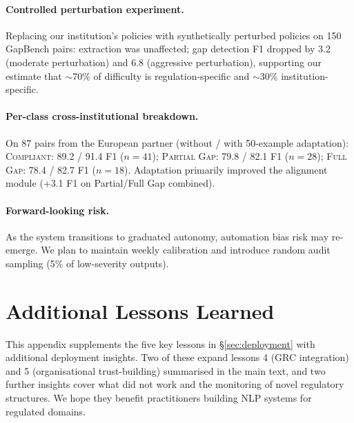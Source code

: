 \documentclass[11pt]{article}
\begin{document}
\paragraph{Controlled perturbation experiment.} Replacing our institution's policies with synthetically perturbed policies on 150 GapBench pairs: extraction was unaffected; gap detection F1 dropped by 3.2 (moderate perturbation) and 6.8 (aggressive perturbation), supporting our estimate that $\sim$70\% of difficulty is regulation-specific and $\sim$30\% institution-specific.

\paragraph{Per-class cross-institutional breakdown.} On 87 pairs from the European partner (without / with 50-example adaptation): \textsc{Compliant}: 89.2 / 91.4 F1 ($n{=}41$); \textsc{Partial Gap}: 79.8 / 82.1 F1 ($n{=}28$); \textsc{Full Gap}: 78.4 / 82.7 F1 ($n{=}18$). Adaptation primarily improved the alignment module (+3.1 F1 on Partial/Full Gap combined).

\paragraph{Forward-looking risk.} As the system transitions to graduated autonomy, automation bias risk may re-emerge. We plan to maintain weekly calibration and introduce random audit sampling (5\% of low-severity outputs).


\section{Additional Lessons Learned}
\label{app:lessons}

This appendix supplements the five key lessons in \S\ref{sec:deployment} with additional deployment insights. Two of these expand lessons 4 (GRC integration) and 5 (organisational trust-building) summarised in the main text, and two further insights cover what did not work and the monitoring of novel regulatory structures. We hope they benefit practitioners building NLP systems for regulated domains.
\end{document}
